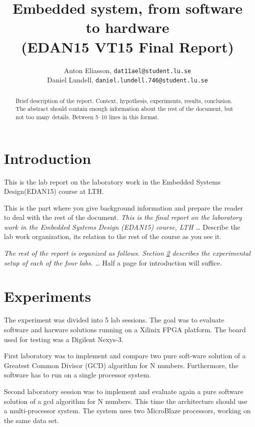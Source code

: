 \documentclass[11pt]{article}
\title{Embedded system, from software to hardware\\\small{(EDAN15 VT15 Final Report)}}
\author{
Anton Eliasson, \texttt{dat11ael@student.lu.se}\\
Daniel Lundell, \texttt{daniel.lundell.746@student.lu.se}
}
\begin{document}
\lstset{
	language=C,
	captionpos=b,
	basicstyle=\footnotesize\ttfamily
}

\maketitle

\begin{abstract}
Brief description of the report. Context, hypothesis, experiments, results, conclusion. The abstract should contain enough
information about the rest of the document, but not too many details. Between 5--10 lines in this format.
\end{abstract}
\section{Introduction}
This is the lab report on the laboratory work in the Embedded Systems Design(EDAN15) course at LTH.


This is the part where you give background information and prepare the reader to deal with the rest of the document. \textit{This is the final report on the laboratory work in the Embedded Systems Design (EDAN15) course, LTH \ldots} Describe the lab work organization, its relation to the rest of the course as you see it.

\textit{The rest of the report is organized as follows. Section \ref{sec:exp} describes the experimental setup of each of the four labs. \ldots} Half a page for introduction will suffice.
\section{Experiments}\label{sec:exp}
The experiment was divided into 5 lab sessions. The goal was to evaluate software and harware solutions running on a Xilinix FPGA platform. The board used for testing was a Digilent Nexys-3.  


First laboratory was to implement and compare two pure soft-ware solution of a Greatest Common Divisor (GCD) algorithm for N numbers. Furthermore, the software has to run on a single processor system.

Second laboratory session was to implement and evaluate again a pure software solution of a gcd algorithm for N numbers. This time the architecture should use a multi-processor system. The system uses two MicroBlaze processors, working on the same data set.
\end{document}
